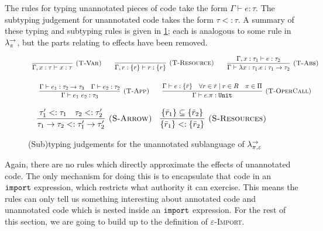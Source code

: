 The rules for typing unannotated pieces of code take the form $\Gamma \vdash e: \tau$. The subtyping judgement for unannotated code takes the form $\tau <: \tau$. A summary of these typing and subtyping rules is given in \ref{fig:unannotated_static_rules}; each is analogous to some rule in $\lambda^{\rightarrow}_{\pi}$, but the parts relating to effects have been removed.

\begin{figure}[h]


\[
\begin{array}{c}


\infer[\textsc{(T-Var)}]
	{\Gamma, x: \tau \vdash x: \tau}
	{}
~~~~~~
\infer[\textsc{(T-Resource)}]
	{\Gamma, r: \{ r \} \vdash r : \{ r \}}
	{}

~~~~~~
\infer[\textsc{(T-Abs)}]
	{\Gamma \vdash \lambda x: \tau_1.e : \tau_1 \rightarrow \tau_2}
	{\Gamma, x: \tau_1 \vdash e: \tau_2}\\[4ex]
	
\infer[\textsc{(T-App)}]
	{\Gamma \vdash e_1~e_2: \tau_3}
	{\Gamma \vdash e_1: \tau_2 \rightarrow \tau_3 & \Gamma \vdash e_2: \tau_2}
~~~~~~
\infer[\textsc{(T-OperCall)}]
	{\Gamma \vdash e.\pi: \kwa{Unit}}
	{\Gamma \vdash e: \{ \bar r \} & \forall r \in \bar r \mid r \in R & \pi \in \Pi}

\end{array}
\]



\fbox{$\tau <: \tau$}

\[
\begin{array}{c}

\infer[\textsc{(S-Arrow)}]
	{ \tau_1 \rightarrow \tau_2 <: \tau_1' \rightarrow \tau_2' }
	{ \tau_1' <: \tau_1 & \tau_2 <: \tau_2' }
	~~~
\infer[\textsc{(S-Resources)}]
	{ \{ \bar r_1 \} <: \{ \bar r_2 \} }
	{ \{ \bar r_1 \} \subseteq \{ \bar r_2 \} }

\end{array}
\]

\vspace{-7pt}
\caption{(Sub)typing judgements for the unannotated sublanguage of $\lambda^{\rightarrow}_{\pi, \varepsilon}$}
\label{fig:unannotated_static_rules}
\end{figure}

Again, there are no rules which directly approximate the effects of unannotated code. The only mechanism for doing this is to encapsulate that code in an $\mathtt{import}$ expression, which restricts what authority it can exercise. This means the rules can only tell us something interesting about annotated code and unannotated code which is nested inside an $\mathtt{import}$ expression. For the rest of this section, we are going to build up to the definition of \textsc{$\varepsilon$-Import}.

